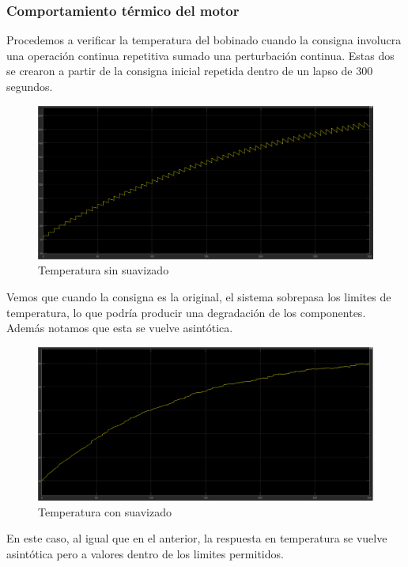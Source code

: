 \documentclass{article}
\begin{document}
\subsubsection{Comportamiento térmico del motor}

Procedemos a verificar la temperatura del bobinado cuando la consigna involucra una operación 
continua repetitiva sumado una perturbación continua. Estas dos se crearon a partir de la consigna 
inicial repetida dentro de un lapso de $300$ segundos.

\begin{figure}[H]
    \centering
    \includegraphics[width=1\textwidth]{5.2.5.1.c.1.png}
    \caption{Temperatura sin suavizado}
\end{figure}

Vemos que cuando la consigna es la original, el sistema sobrepasa los limites de temperatura, lo 
que podría producir una degradación de los componentes. Además notamos que esta se vuelve 
asintótica.
    
\begin{figure}[H]
    \centering
    \includegraphics[width=1\textwidth]{5.2.5.1.c.2.png}
    \caption{Temperatura con suavizado}
\end{figure}
    
En este caso, al igual que en el anterior, la respuesta en temperatura se vuelve asintótica pero 
a valores dentro de los limites permitidos.
\end{document}
